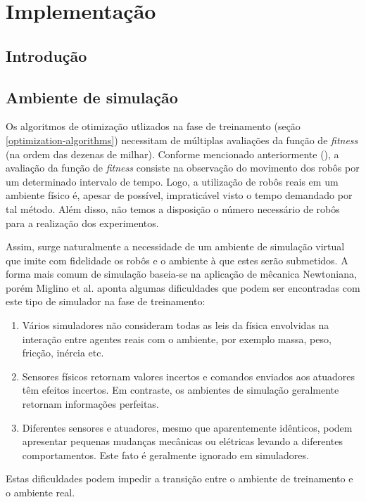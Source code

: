 \chapter{Implementação}
\label{implementacao}

\section{Introdução}

\section{Ambiente de simulação}

Os algoritmos de otimização utlizados na fase de treinamento (seção \ref{optimization-algorithms}) necessitam de múltiplas avaliações da função de \textit{fitness} (na ordem das dezenas de milhar). Conforme mencionado anteriormente (), a avaliação da função de \textit{fitness} consiste na observação do movimento dos robôs por um determinado intervalo de tempo. Logo, a utilização de robôs reais em um ambiente físico é, apesar de possível, impraticável visto o tempo demandado por tal método. Além disso, não temos a disposição o número necessário de robôs para a realização dos experimentos.

Assim, surge naturalmente a necessidade de um ambiente de simulação virtual que imite com fidelidade os robôs e o ambiente à que estes serão submetidos. A forma mais comum de simulação baseia-se na aplicação de mêcanica Newtoniana, porém Miglino et al. \cite{miglino96evolving} aponta algumas dificuldades que podem ser encontradas com este tipo de simulador na fase de treinamento:
\begin{enumerate}
    \item Vários simuladores não consideram todas as leis da física envolvidas na interação entre agentes reais com o ambiente, por exemplo massa, peso, fricção, inércia etc.
    \item Sensores físicos retornam valores incertos e comandos enviados aos atuadores têm efeitos incertos. Em contraste, os ambientes de simulação geralmente retornam informações perfeitas.
    \item Diferentes sensores e atuadores, mesmo que aparentemente idênticos, podem apresentar pequenas mudanças mecânicas ou elétricas levando a diferentes comportamentos. Este fato é geralmente ignorado em simuladores.
\end{enumerate}

Estas dificuldades podem impedir a transição entre o ambiente de treinamento e o ambiente real.

